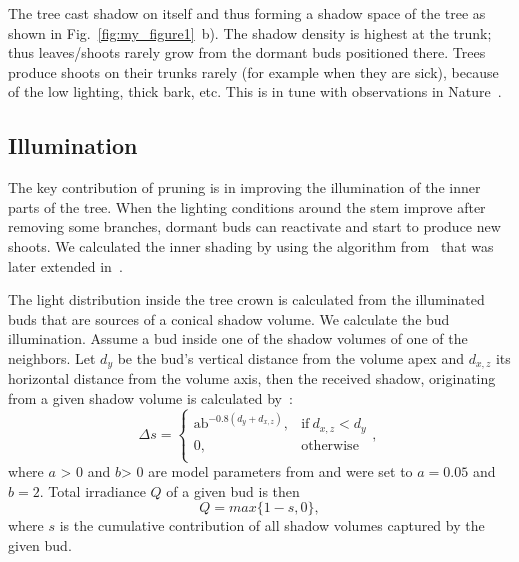 The tree cast shadow on itself and thus
forming a shadow space of the tree as shown in Fig.~\ref{fig:my_figure1}~b). The shadow
density is highest at the trunk; thus leaves/shoots rarely grow from the
dormant buds positioned there. Trees produce shoots on their trunks rarely (for example when they are sick), because of the low lighting, thick bark, etc. This is in tune with observations in Nature~\cite{wohlleben2016hidden}.



\subsection{Illumination}
The key contribution of pruning is in
improving the illumination of the inner parts of the tree. When the
lighting conditions around the stem improve after removing some
branches, dormant buds can reactivate and start to produce new shoots. We calculated the inner shading by using the algorithm from~\cite{palubicki_self-organizing_2009}
that was later extended in~\cite{pirk_plastic_2012,stava_inverse_2014,strnad_novel_2017}. 

The light distribution
inside the tree crown is calculated from the illuminated buds that are
sources of a conical shadow volume. We calculate the bud illumination.
Assume a bud inside one of the shadow volumes of one of the
neighbors. Let \(d_{y}\) be the bud's vertical distance from the volume
apex and \(d_{x,z}\) its horizontal distance from the volume axis, then
the received shadow, originating from a given shadow volume is
calculated by~\cite{strnad_novel_2017}:
\begin{equation}
\Delta s = \left\{ \begin{matrix}
\text{ab}^{- 0.8\left( d_{y} + d_{x,z} \right)}, & \mathrm{\text{if}}\ d_{x,z} < d_{y} \\
0, & \mathrm{otherwise} \\
\end{matrix}, \right.\    
\end{equation}
where \(a\) \textgreater{} 0 and \(b\)\textgreater{} 0 are model
parameters from \cite{palubicki_self-organizing_2009} and were set to \(a = 0.05\) and \(b = 2\).
Total irradiance $Q$ of a given bud is then
\begin{equation}
  Q = max\{1 - s, 0\},\label{eqn:q}  
\end{equation}
where \(s\) is the cumulative contribution of all shadow volumes
captured by the given bud.

